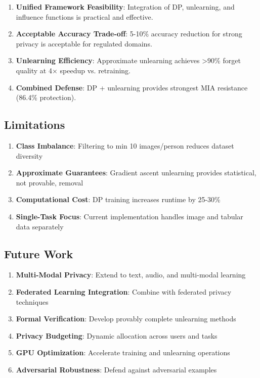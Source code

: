 \documentclass[conference]{IEEEtran}
\begin{document}
\begin{enumerate}
    \item \textbf{Unified Framework Feasibility}: Integration of DP, unlearning, and influence functions is practical and effective.
    \item \textbf{Acceptable Accuracy Trade-off}: 5-10\% accuracy reduction for strong privacy is acceptable for regulated domains.
    \item \textbf{Unlearning Efficiency}: Approximate unlearning achieves >90\% forget quality at 4× speedup vs. retraining.
    \item \textbf{Combined Defense}: DP + unlearning provides strongest MIA resistance (86.4\% protection).
\end{enumerate}

\subsection{Limitations}

\begin{enumerate}
    \item \textbf{Class Imbalance}: Filtering to min 10 images/person reduces dataset diversity
    \item \textbf{Approximate Guarantees}: Gradient ascent unlearning provides statistical, not provable, removal
    \item \textbf{Computational Cost}: DP training increases runtime by 25-30\%
    \item \textbf{Single-Task Focus}: Current implementation handles image and tabular data separately
\end{enumerate}

\subsection{Future Work}

\begin{enumerate}
    \item \textbf{Multi-Modal Privacy}: Extend to text, audio, and multi-modal learning
    \item \textbf{Federated Learning Integration}: Combine with federated privacy techniques
    \item \textbf{Formal Verification}: Develop provably complete unlearning methods
    \item \textbf{Privacy Budgeting}: Dynamic allocation across users and tasks
    \item \textbf{GPU Optimization}: Accelerate training and unlearning operations
    \item \textbf{Adversarial Robustness}: Defend against adversarial examples
\end{enumerate}
\end{document}
